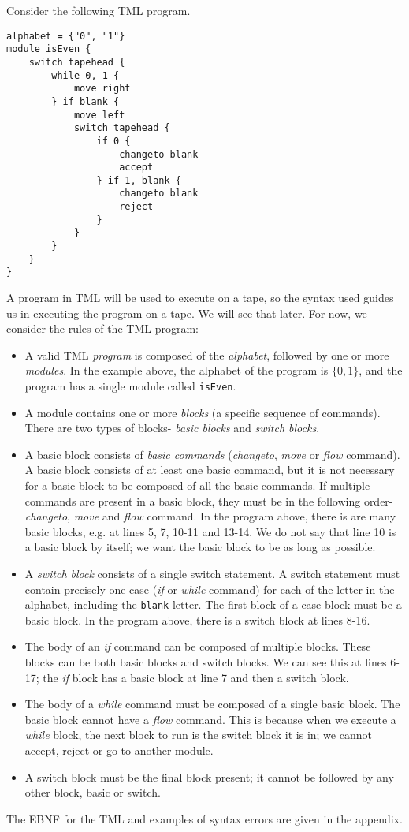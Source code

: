 Consider the following TML program.
\begin{lstlisting}[language=TML]
alphabet = {"0", "1"}
module isEven {
    switch tapehead {
        while 0, 1 {
            move right
        } if blank {
            move left
            switch tapehead {
                if 0 {
                    changeto blank
                    accept
                } if 1, blank {
                    changeto blank
                    reject
                }
            }
        }
    }
}
\end{lstlisting}
A program in TML will be used to execute on a tape, so the syntax used guides us in executing the program on a tape. We will see that later. For now, we consider the rules of the TML program:
\begin{itemize}
    \item A valid TML \emph{program} is composed of the \emph{alphabet}, followed by one or more \emph{modules}. In the example above, the alphabet of the program is $\{0, 1\}$, and the program has a single module called \texttt{isEven}.
    \item A module contains one or more \emph{blocks} (a specific sequence of commands). There are two types of blocks- \emph{basic blocks} and \emph{switch blocks}.
    \item A basic block consists of \emph{basic commands} (\textit{changeto}, \textit{move} or \textit{flow} command). A basic block consists of at least one basic command, but it is not necessary for a basic block to be composed of all the basic commands. If multiple commands are present in a basic block, they must be in the following order- \textit{changeto}, \textit{move} and \textit{flow} command. In the program above, there is are many basic blocks, e.g. at lines 5, 7, 10-11 and 13-14. We do not say that line 10 is a basic block by itself; we want the basic block to be as long as possible.
    \item A \emph{switch block} consists of a single switch statement. A switch statement must contain precisely one case (\textit{if} or \textit{while} command) for each of the letter in the alphabet, including the \texttt{blank} letter. The first block of a case block must be a basic block. In the program above, there is a switch block at lines 8-16.
    \item The body of an \textit{if} command can be composed of multiple blocks. These blocks can be both basic blocks and switch blocks. We can see this at lines 6-17; the \textit{if} block has a basic block at line 7 and then a switch block.
    \item The body of a \textit{while} command must be composed of a single basic block. The basic block cannot have a \textit{flow} command. This is because when we execute a \textit{while} block, the next block to run is the switch block it is in; we cannot accept, reject or go to another module.
    \item A switch block must be the final block present; it cannot be followed by any other block, basic or switch.
\end{itemize}
The EBNF for the TML and examples of syntax errors are given in the appendix. 

